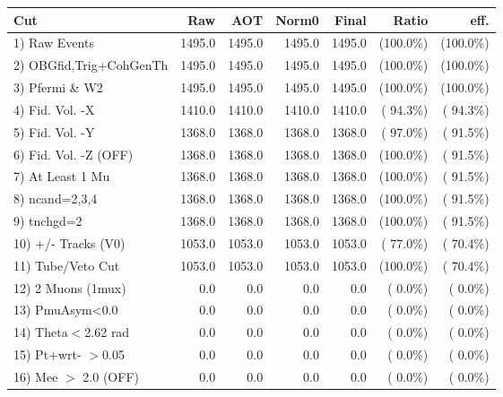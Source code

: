  \begin{table}[h!]\centering
 \begin{tabular}{||l||r|r|r|r|r|r||}
 \hline
 \hline
 Cut & Raw & AOT & Norm0 & Final & Ratio & eff.       \\
 \hline
  1) Raw Events           &       1495.0 &       1495.0 &       1495.0 &       1495.0 & (100.0\%) & (100.0\%) \\
  2) OBGfid,Trig+CohGenTh &       1495.0 &       1495.0 &       1495.0 &       1495.0 & (100.0\%) & (100.0\%) \\
  3) Pfermi \& W2         &       1495.0 &       1495.0 &       1495.0 &       1495.0 & (100.0\%) & (100.0\%) \\
  4) Fid. Vol. -X         &       1410.0 &       1410.0 &       1410.0 &       1410.0 & ( 94.3\%) & ( 94.3\%) \\
  5) Fid. Vol. -Y         &       1368.0 &       1368.0 &       1368.0 &       1368.0 & ( 97.0\%) & ( 91.5\%) \\
  6) Fid. Vol. -Z (OFF)   &       1368.0 &       1368.0 &       1368.0 &       1368.0 & (100.0\%) & ( 91.5\%) \\
  7) At Least 1 Mu        &       1368.0 &       1368.0 &       1368.0 &       1368.0 & (100.0\%) & ( 91.5\%) \\
  8) ncand=2,3,4          &       1368.0 &       1368.0 &       1368.0 &       1368.0 & (100.0\%) & ( 91.5\%) \\
  9) tnchgd=2             &       1368.0 &       1368.0 &       1368.0 &       1368.0 & (100.0\%) & ( 91.5\%) \\
 10) +/- Tracks (V0)      &       1053.0 &       1053.0 &       1053.0 &       1053.0 & ( 77.0\%) & ( 70.4\%) \\
 11) Tube/Veto Cut        &       1053.0 &       1053.0 &       1053.0 &       1053.0 & (100.0\%) & ( 70.4\%) \\
 12) 2 Muons (1mux)       &          0.0 &          0.0 &          0.0 &          0.0 & (  0.0\%) & (  0.0\%) \\
 13) PmuAsym<0.0          &          0.0 &          0.0 &          0.0 &          0.0 & (  0.0\%) & (  0.0\%) \\
 14) Theta$<$2.62 rad     &          0.0 &          0.0 &          0.0 &          0.0 & (  0.0\%) & (  0.0\%) \\
 15) Pt+wrt- $>$0.05      &          0.0 &          0.0 &          0.0 &          0.0 & (  0.0\%) & (  0.0\%) \\
 16) Mee $>$ 2.0  (OFF)   &          0.0 &          0.0 &          0.0 &          0.0 & (  0.0\%) & (  0.0\%) \\

\end{tabular}
\end{table}
